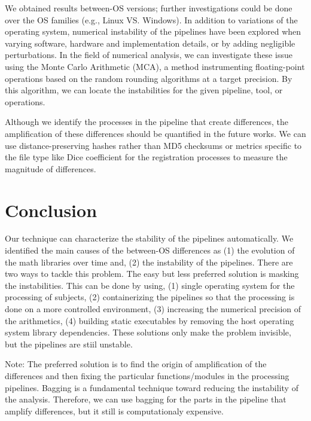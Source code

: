 \documentclass[a4paper,num-refs]{oup-contemporary}
\newcommand{\note}[2]{\color{blue}Note: #1\color{black}}
\begin{document}
We obtained results between-OS versions; further investigations could be done over the OS families (e.g., Linux VS. Windows).
In addition to variations of the operating system, numerical instability of the pipelines have been 
explored when varying software, hardware and implementation details, or by adding negligible perturbations.
In the field of numerical analysis, we can investigate these issue using the Monte Carlo Arithmetic (MCA), 
a method instrumenting floating-point operations based on the random rounding algorithms at a target precision.
By this algorithm, we can locate the instabilities for the given pipeline, tool, or operations.

Although we identify the processes in the pipeline that create differences, 
the amplification of these differences should be quantified in the future works.
We can use distance-preserving hashes rather than MD5 checksums or metrics specific to the file type like Dice coefficient 
for the registration processes to measure the magnitude of differences. 


\section{Conclusion}

Our technique can characterize the stability of the pipelines
automatically. We identified the main causes of the between-OS differences as (1) the evolution 
of the math libraries over time and, (2) the instability of the pipelines. 
There are two ways to tackle this problem. The easy but less preferred solution is masking the instabilities.
This can be done by using, (1) single operating system for the processing of subjects, 
(2) containerizing the pipelines so that the 
processing is done on a more controlled environment, 
(3) increasing the numerical precision of the arithmetics, 
(4) building static executables by removing the host operating system library dependencies. 
These solutions only make the problem invisible, but the pipelines are stiil unstable.

\note{The preferred solution is to find the origin of amplification of the differences and 
then fixing the particular functions/modules in the processing pipelines. 
Bagging is a fundamental technique toward reducing the instability of the analysis.
Therefore, we can use bagging for the parts in the pipeline that amplify differences, 
but it still is computationaly expensive. }


\section{Acknowledgments}
\end{document}
